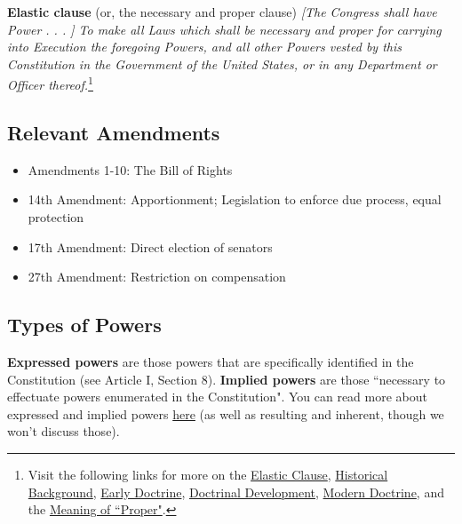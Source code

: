 \documentclass[10pt]{article}
\begin{document}
\noindent \textbf{Elastic clause} (or, the necessary and proper clause) \newline \textit{[The Congress shall have Power . . . ] To make all Laws which shall be necessary and proper for carrying into Execution the foregoing Powers, and all other Powers vested by this Constitution in the Government of the United States, or in any Department or Officer thereof.}\footnote{Visit the following links for more on the \href{https://constitution.congress.gov/browse/essay/artI-S8-C18-1/ALDE_00001242/}{Elastic Clause}, \href{https://constitution.congress.gov/browse/essay/artI-S8-C18-2/ALDE_00001237/}{Historical Background}, \href{https://constitution.congress.gov/browse/essay/artI-S8-C18-3/ALDE_00001238/}{Early Doctrine},  \href{https://constitution.congress.gov/browse/essay/artI-S8-C18-4/ALDE_00001239/}{Doctrinal Development}, \href{https://constitution.congress.gov/browse/essay/artI-S8-C18-5/ALDE_00001240/}{Modern Doctrine}, and the \href{https://constitution.congress.gov/browse/essay/artI-S8-C18-6/ALDE_00001241/}{Meaning of ``Proper"}.}





\subsection{Relevant Amendments}

\begin{itemize}
    \item Amendments 1-10: The Bill of Rights
    \item 14th Amendment: Apportionment; Legislation to enforce due process, equal protection
    \item 17th Amendment: Direct election of senators
    \item 27th Amendment: Restriction on compensation
\end{itemize}

\subsection{Types of Powers}

\textbf{Expressed powers} are those powers that are specifically identified in the Constitution (see Article I, Section 8). \textbf{Implied powers} are those ``necessary to effectuate powers enumerated in the Constitution". You can read more about expressed and implied powers \href{https://constitution.congress.gov/browse/essay/artI-S1-3-3/ALDE_00013292/}{here} (as well as resulting and inherent, though we won't discuss those). 
\end{document}
